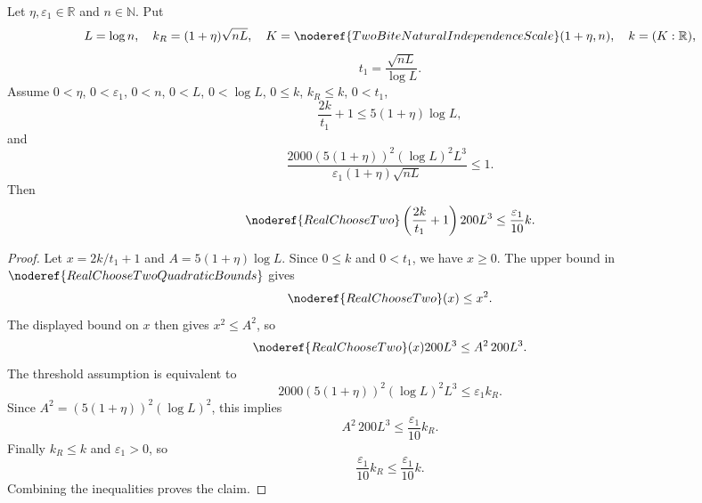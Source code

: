 \begin{helper}
Let \(\eta,\varepsilon_1\in\mathbb R\) and \(n\in\mathbb N\).  Put
\[
L=\log n,\quad
k_R=(1+\eta)\sqrt{nL},\quad
K=\noderef{TwoBiteNaturalIndependenceScale}(1+\eta,n),\quad k=(K:\mathbb R),
\]
\[
t_1=\frac{\sqrt{nL}}{\log L}.
\]
Assume \(0<\eta\), \(0<\varepsilon_1\), \(0<n\), \(0<L\), \(0<\log L\),
\(0\le k\), \(k_R\le k\), \(0<t_1\),
\[
\frac{2k}{t_1}+1\le5(1+\eta)\log L,
\]
and
\[
\frac{2000(5(1+\eta))^2(\log L)^2L^3}
{\varepsilon_1(1+\eta)\sqrt{nL}}\le1.
\]
Then
\[
\noderef{RealChooseTwo}\left(\frac{2k}{t_1}+1\right)200L^3
\le\frac{\varepsilon_1}{10}k.
\]
\end{helper}
\begin{proof}
Let \(x=2k/t_1+1\) and \(A=5(1+\eta)\log L\).  Since \(0\le k\) and
\(0<t_1\), we have \(x\ge0\).  The upper bound in
\(\noderef{RealChooseTwoQuadraticBounds}\) gives
\[
\noderef{RealChooseTwo}(x)\le x^2.
\]
The displayed bound on \(x\) then gives \(x^2\le A^2\), so
\[
\noderef{RealChooseTwo}(x)200L^3\le A^2\,200L^3.
\]
The threshold assumption is equivalent to
\[
2000(5(1+\eta))^2(\log L)^2L^3\le\varepsilon_1 k_R.
\]
Since \(A^2=(5(1+\eta))^2(\log L)^2\), this implies
\[
A^2\,200L^3\le\frac{\varepsilon_1}{10}k_R.
\]
Finally \(k_R\le k\) and \(\varepsilon_1>0\), so
\[
\frac{\varepsilon_1}{10}k_R\le\frac{\varepsilon_1}{10}k.
\]
Combining the inequalities proves the claim.
\end{proof}
